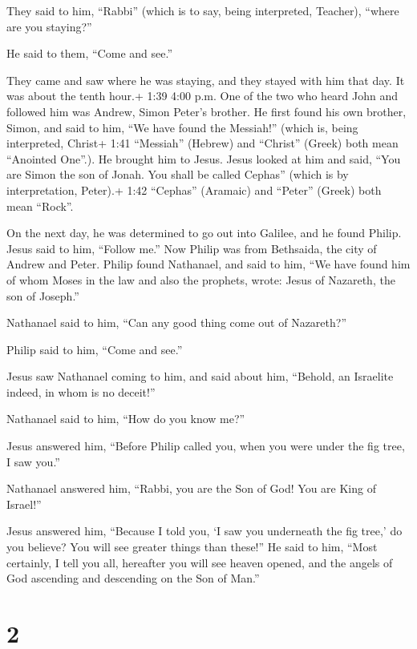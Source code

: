 They said to him, ``Rabbi'' (which is to say, being interpreted,
Teacher), ``where are you staying?''

 He said to them, ``Come and see.''

They came and saw where he was staying, and they stayed with him that
day. It was about the tenth hour.+ 1:39 4:00 p.m.  One of
the two who heard John and followed him was Andrew, Simon Peter's
brother.  He first found his own brother, Simon, and said
to him, ``We have found the Messiah!'' (which is, being interpreted,
Christ+ 1:41 ``Messiah'' (Hebrew) and ``Christ'' (Greek) both mean
``Anointed One''.).  He brought him to Jesus. Jesus looked
at him and said, ``You are Simon the son of Jonah. You shall be called
Cephas'' (which is by interpretation, Peter).+ 1:42 ``Cephas'' (Aramaic)
and ``Peter'' (Greek) both mean ``Rock''.

 On the next day, he was determined to go out into Galilee,
and he found Philip. Jesus said to him, ``Follow me.''  Now
Philip was from Bethsaida, the city of Andrew and Peter. 
Philip found Nathanael, and said to him, ``We have found him of whom
Moses in the law and also the prophets, wrote: Jesus of Nazareth, the
son of Joseph.''

 Nathanael said to him, ``Can any good thing come out of
Nazareth?''

Philip said to him, ``Come and see.''

 Jesus saw Nathanael coming to him, and said about him,
``Behold, an Israelite indeed, in whom is no deceit!''

 Nathanael said to him, ``How do you know me?''

Jesus answered him, ``Before Philip called you, when you were under the
fig tree, I saw you.''

 Nathanael answered him, ``Rabbi, you are the Son of God!
You are King of Israel!''

 Jesus answered him, ``Because I told you, `I saw you
underneath the fig tree,' do you believe? You will see greater things
than these!''  He said to him, ``Most certainly, I tell you
all, hereafter you will see heaven opened, and the angels of God
ascending and descending on the Son of Man.''

\hypertarget{section-1}{%
\section{2}\label{section-1}}

